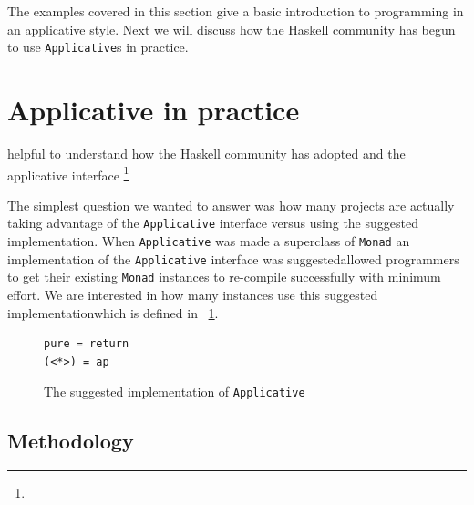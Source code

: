 The examples covered in this section give a basic introduction to programming in an applicative style. Next we will discuss how the Haskell community has begun to use \texttt{Applicative}s in practice. 

\section{Applicative in practice}
\label{sec:appInPractice}

\DIFdelbegin {}\DIFdelend \DIFaddbegin {}\DIFaddend helpful to understand how the Haskell community has adopted and \DIFdelbegin {}\DIFdelend \DIFaddbegin {}\DIFaddend the applicative interface \DIFdelbegin {}\DIFdelend \DIFaddbegin {}\footnote{} 

\DIFaddend The simplest question we wanted to answer was how many projects are actually taking advantage of the \texttt{Applicative} interface versus using the suggested implementation. When \texttt{Applicative} was made a superclass of \texttt{Monad} an implementation of the \texttt{Applicative} interface was suggested\DIFdelbegin {}\DIFdelend \DIFaddbegin {}\DIFaddend allowed programmers to get their existing \texttt{Monad} instances to re-compile successfully with minimum effort. We are interested in how many instances use this suggested implementation\DIFaddbegin \DIFadd{, }\DIFaddend which is defined in \DIFdelbegin {}\DIFdelend \DIFaddbegin {}\DIFaddend ~\ref{appSugImp}.

\begin{figure}[t]
\begin{lstlisting}
pure = return
(<*>) = ap
\end{lstlisting}
\caption{The suggested implementation of \texttt{Applicative}}
\label{appSugImp}
\end{figure}

\subsection{Methodology}

